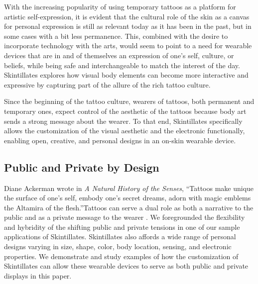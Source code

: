 \documentclass{sigchi}
\begin{document}
With the increasing popularity of using temporary tattoos as a platform for artistic self-expression\cite{Fanning:v_9LfC8A,ByCourtneyRubin:tj}, it is evident that the cultural role of the skin as a canvas for personal expression is still as relevant today as it has been in the past, but in some cases with a bit less permanence.  This, combined with the desire to incorporate technology with the arts, would seem to point to a need for wearable devices that are in and of themselves an expression of one's self, culture, or beliefs, while being safe and interchangeable to match the interest of the day. Skintillates explores how visual body elements can become more interactive and expressive by capturing part of the allure of the rich tattoo culture. 

Since the beginning of the tattoo culture, wearers of tattoos, both permanent and temporary ones, expect control of the aesthetic of the tattoos because body art sends a strong message about the wearer\cite{Doss:2009ee,McLeod:2014ua}. To that end, Skintillates specifically allows the customization of the visual aesthetic and the electronic functionally, enabling open, creative, and personal designs in an on-skin wearable device.

\subsection{Public and Private by Design}
Diane Ackerman wrote in \textit{A Natural History of the Senses}, ``Tattoos make unique the surface of one's self, embody one's secret dreams, adorn with magic emblems the Altamira of the flesh\cite{Mifflin:2013ux}.''Tattoos can serve a dual role as both a narrative to the public and as a private message to the wearer \cite{Doss:2009ee,McLeod:2014ua}. We foregrounded the flexibility and hybridity of the shifting public and private tensions in one of our sample applications of Skintillates. Skintillates also affords a wide range of personal designs varying in size, shape, color, body location, sensing, and electronic properties. We demonstrate and study examples of how the customization of Skintillates can allow these wearable devices to serve as both public and private displays in this paper. 
\end{document}
